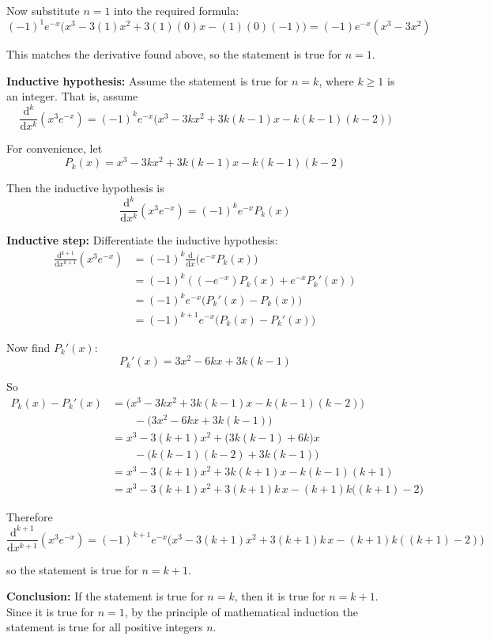 \documentclass[leqno]{article}
\begin{document}
\begin{enumerate}[
  label=\textbf{\arabic*.},
  leftmargin=*,
  topsep=0pt,
  partopsep=0pt,
  parsep=0pt
]
\begin{djsSolution}
Now substitute $n=1$ into the required formula:
\[
(-1)^1 e^{-x}\bigl(x^3-3(1)x^2+3(1)(0)x-(1)(0)(-1)\bigr)
=
(-1)e^{-x}(x^3-3x^2)
\]

This matches the derivative found above, so the statement is true for \(n=1\).

\textbf{Inductive hypothesis:} Assume the statement is true for \(n=k\), where \(k\ge 1\) is an integer. That is, assume
\[
\frac{\mathrm{d}^k}{\mathrm{d}x^k}(x^3e^{-x})
=
(-1)^k e^{-x}\bigl(x^3-3kx^2+3k(k-1)x-k(k-1)(k-2)\bigr)
\]

For convenience, let
\[
P_k(x)=x^3-3kx^2+3k(k-1)x-k(k-1)(k-2)
\]

Then the inductive hypothesis is
\[
\frac{\mathrm{d}^k}{\mathrm{d}x^k}(x^3e^{-x})=(-1)^k e^{-x}P_k(x)
\]

\textbf{Inductive step:} Differentiate the inductive hypothesis:
\begin{align*}
\frac{\mathrm{d}^{k+1}}{\mathrm{d}x^{k+1}}(x^3e^{-x})
&=
(-1)^k\frac{\mathrm{d}}{\mathrm{d}x}\bigl(e^{-x}P_k(x)\bigr)\\
&=
(-1)^k\left((-e^{-x})P_k(x)+e^{-x}P_k'(x)\right)\\
&=
(-1)^k e^{-x}\bigl(P_k'(x)-P_k(x)\bigr)\\
&=
(-1)^{k+1} e^{-x}\bigl(P_k(x)-P_k'(x)\bigr)
\end{align*}

Now find $P_k'(x)$:
\[
P_k'(x)=3x^2-6kx+3k(k-1)
\]

So
\begin{align*}
P_k(x)-P_k'(x)
&=
\bigl(x^3-3kx^2+3k(k-1)x-k(k-1)(k-2)\bigr)\\
&\qquad-\bigl(3x^2-6kx+3k(k-1)\bigr)\\
&=
x^3-3(k+1)x^2+\bigl(3k(k-1)+6k\bigr)x\\
&\qquad-\bigl(k(k-1)(k-2)+3k(k-1)\bigr)\\
&=
x^3-3(k+1)x^2+3k(k+1)x-k(k-1)(k+1)\\
&=
x^3-3(k+1)x^2+3(k+1)k\,x-(k+1)k\bigl((k+1)-2\bigr)
\end{align*}

Therefore
\[
\frac{\mathrm{d}^{k+1}}{\mathrm{d}x^{k+1}}(x^3e^{-x})
=
(-1)^{k+1}e^{-x}\bigl(x^3-3(k+1)x^2+3(k+1)k\,x-(k+1)k((k+1)-2)\bigr)
\]

so the statement is true for \(n=k+1\).

\textbf{Conclusion:} If the statement is true for \(n=k\), then it is true for \(n=k+1\). Since it is true for \(n=1\), by the principle of mathematical induction the statement is true for all positive integers \(n\).
\end{djsSolution}



\end{enumerate}
\end{document}
